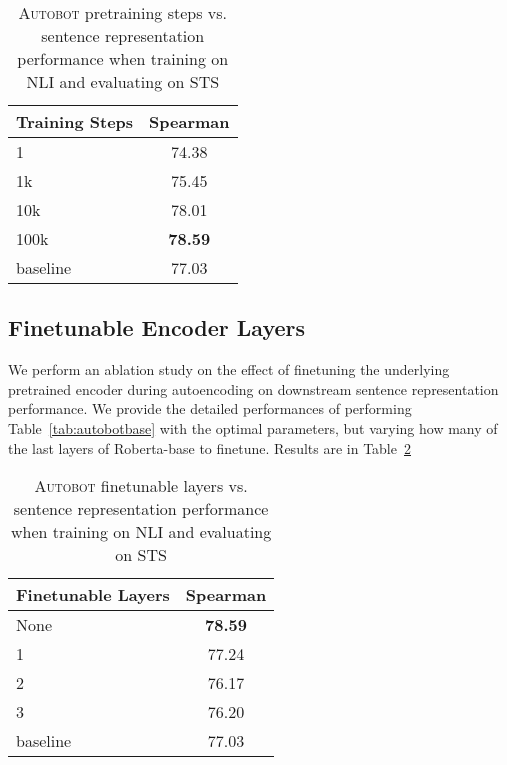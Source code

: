 \begin{table}[ht!]
	\centering 
	\footnotesize
	\begin{tabular}{ l | c }
		\toprule
		\textbf{Training Steps} & \textbf{Spearman} \\ \midrule
		1 & 74.38 \\
		1k & 75.45 \\
		10k & 78.01 \\
		100k & \textbf{78.59}  \\
		\hline
		baseline & 77.03 \\
        \bottomrule
	\end{tabular}
	\caption{\label{tab:autosteps}\textsc{Autobot} pretraining steps vs. sentence representation performance when training on NLI and evaluating on STS}
	
\end{table}


\subsection{Finetunable Encoder Layers}\label{adx:finetune}
We perform an ablation study on the effect of finetuning the underlying pretrained encoder during autoencoding on downstream sentence representation performance. We provide the detailed performances of performing Table~\ref{tab:autobotbase} with the optimal parameters, but varying how many of the last layers of Roberta-base to finetune. Results are in Table~\ref{tab:finetune}

\begin{table}[ht!]
	\centering 
	\footnotesize

	\begin{tabular}{ l | c }
		\toprule
		\textbf{Finetunable Layers} & \textbf{Spearman} \\ \midrule
		None & \textbf{78.59} \\
		1 & 77.24 \\
		2 & 76.17 \\
		3 & 76.20 \\
		\hline
		baseline & 77.03 \\
        \bottomrule
	\end{tabular}
	\caption{\label{tab:finetune} \textsc{Autobot} finetunable layers vs. sentence representation performance when training on NLI and evaluating on STS}
	
\end{table} 


